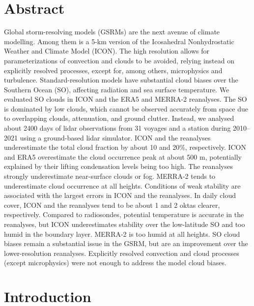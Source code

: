 \documentclass[12pt,a4paper]{article}
\begin{document}
\section*{Abstract}

Global storm-resolving models (GSRMs) are the next avenue of climate modelling.
Among them is a 5-km version of the Icosahedral Nonhydrostatic Weather and
Climate Model (ICON). The high resolution allows for parameterizations of
convection and clouds to be avoided, relying instead on explicitly resolved
processes, except for, among others, microphysics and turbulence.  Standard-resolution models have substantial cloud biases over the
Southern Ocean (SO), affecting radiation and sea surface temperature.  We
evaluated SO clouds in ICON and the ERA5 and MERRA-2 reanalyses.  The SO is
dominated by low clouds, which cannot be observed accurately from space due to
overlapping clouds, attenuation, and ground clutter.  Instead, we analysed
about 2400 days of lidar observations from 31 voyages and a station during
2010--2021 using a ground-based lidar simulator.  ICON and the reanalyses
underestimate the total cloud fraction by about 10 and 20\%, respectively. ICON
and ERA5 overestimate the cloud occurrence peak at about 500 m, potentially
explained by their lifting condensation levels being too high.  The reanalyses
strongly underestimate near-surface clouds or fog.  MERRA-2 tends to
underestimate cloud occurrence at all heights. Conditions of weak stability are associated with the largest errors in ICON and the reanalyses.  In daily cloud cover, ICON and
the reanalyses tend to be about 1 and 2 oktas clearer, respectively. Compared
to radiosondes, potential temperature is accurate in the reanalyses, but ICON
underestimates stability over the low-latitude SO and too humid in the boundary
layer. MERRA-2 is too humid at all heights. SO cloud biases remain a
substantial issue in the GSRM, but are an improvement over the lower-resolution
reanalyses. Explicitly resolved convection and cloud processes (except microphysics) were not enough
to address the model cloud biases.

\section{Introduction}
\label{sec:introduction}
\end{document}
